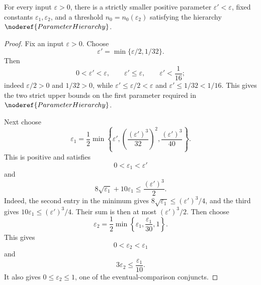 \begin{lemma}
For every input \(\varepsilon>0\), there is a strictly smaller positive
parameter \(\varepsilon'< \varepsilon\), fixed constants
\(\varepsilon_1,\varepsilon_2\), and a threshold \(n_0=n_0(\varepsilon_2)\)
satisfying the hierarchy
\(\noderef{ParameterHierarchy}\).
\end{lemma}
\begin{proof}
Fix an input \(\varepsilon>0\).  Choose
\[
 \varepsilon'=\min\{\varepsilon/2,1/32\}.
\]
Then
\[
0<\varepsilon'< \varepsilon,\qquad
\varepsilon'\le\varepsilon,\qquad
\varepsilon'<\frac1{16};
\]
indeed \(\varepsilon/2>0\) and \(1/32>0\), while
\(\varepsilon'\le\varepsilon/2<\varepsilon\) and
\(\varepsilon'\le1/32<1/16\).  This gives the two strict upper bounds on the
first parameter required in
\(\noderef{ParameterHierarchy}\).

Next choose
\[
\varepsilon_1=
\frac12\min\left\{
\varepsilon',
\left(\frac{(\varepsilon')^3}{32}\right)^2,
\frac{(\varepsilon')^3}{40}
\right\}.
\]
This is positive and satisfies
\[
0<\varepsilon_1<\varepsilon'
\]
and
\[
8\sqrt{\varepsilon_1}+10\varepsilon_1\le \frac{(\varepsilon')^3}{2}.
\]
Indeed, the second entry in the minimum gives
\(8\sqrt{\varepsilon_1}\le(\varepsilon')^3/4\), and the third gives
\(10\varepsilon_1\le(\varepsilon')^3/4\).  Their sum is then at most
\((\varepsilon')^3/2\).  Then choose
\[
\varepsilon_2=\frac12\min\left\{
\varepsilon_1,\frac{\varepsilon_1}{30},1\right\}.
\]
This gives
\[
0<\varepsilon_2<\varepsilon_1
\]
and
\[
3\varepsilon_2\le \frac{\varepsilon_1}{10}.
\]
It also gives \(0\le\varepsilon_2\le1\), one of the eventual-comparison
conjuncts.


\end{proof}
